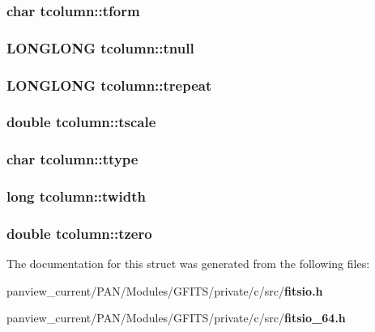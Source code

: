 \subsubsection{\setlength{\rightskip}{0pt plus 5cm}char \bf{tcolumn::tform}}\label{structtcolumn_609257ec1c8279fdf64be8375c0609b2}


\subsubsection{\setlength{\rightskip}{0pt plus 5cm}\bf{LONGLONG} \bf{tcolumn::tnull}}\label{structtcolumn_ed35d391d722390693403b9c9f0649e1}


\subsubsection{\setlength{\rightskip}{0pt plus 5cm}\bf{LONGLONG} \bf{tcolumn::trepeat}}\label{structtcolumn_4d734519fdd15fc3261c374d351df0c0}


\subsubsection{\setlength{\rightskip}{0pt plus 5cm}double \bf{tcolumn::tscale}}\label{structtcolumn_cc57a3fa41ea199bb8bd6a231b6f6ba4}


\subsubsection{\setlength{\rightskip}{0pt plus 5cm}char \bf{tcolumn::ttype}}\label{structtcolumn_425c648c5f2fa56c925169e50c1f064a}


\subsubsection{\setlength{\rightskip}{0pt plus 5cm}long \bf{tcolumn::twidth}}\label{structtcolumn_f99694f559adfc395190b82bb702b255}


\subsubsection{\setlength{\rightskip}{0pt plus 5cm}double \bf{tcolumn::tzero}}\label{structtcolumn_1116351871bcec610d1b835d6fc53b77}




The documentation for this struct was generated from the following files:\begin{CompactItemize}
\item 
panview\_\-current/PAN/Modules/GFITS/private/c/src/\bf{fitsio.h}\item 
panview\_\-current/PAN/Modules/GFITS/private/c/src/\bf{fitsio\_\-64.h}\end{CompactItemize}
